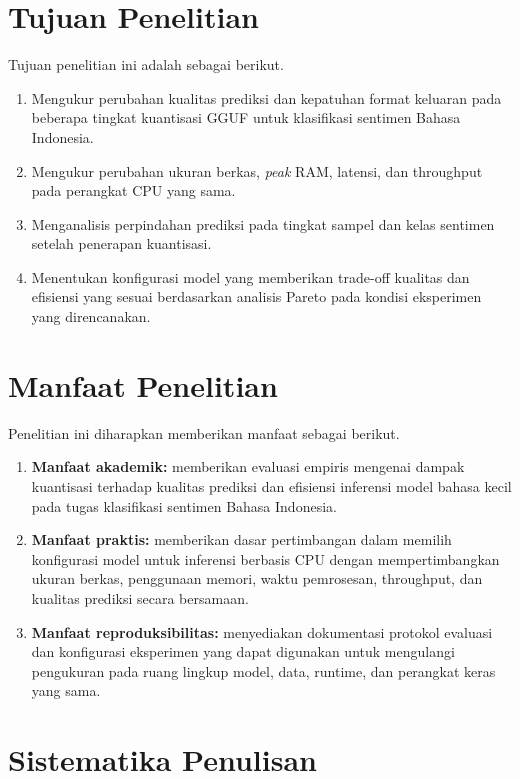 \section{Tujuan Penelitian}

Tujuan penelitian ini adalah sebagai berikut.

\begin{enumerate}
  \item Mengukur perubahan kualitas prediksi dan kepatuhan format keluaran pada beberapa tingkat kuantisasi GGUF untuk klasifikasi sentimen Bahasa Indonesia.
  \item Mengukur perubahan ukuran berkas, \textit{peak} RAM, latensi, dan throughput pada perangkat CPU yang sama.
  \item Menganalisis perpindahan prediksi pada tingkat sampel dan kelas sentimen setelah penerapan kuantisasi.
  \item Menentukan konfigurasi model yang memberikan trade-off kualitas dan efisiensi yang sesuai berdasarkan analisis Pareto pada kondisi eksperimen yang direncanakan.
\end{enumerate}

\section{Manfaat Penelitian}

Penelitian ini diharapkan memberikan manfaat sebagai berikut.

\begin{enumerate}
  \item \textbf{Manfaat akademik:} memberikan evaluasi empiris mengenai dampak kuantisasi terhadap kualitas prediksi dan efisiensi inferensi model bahasa kecil pada tugas klasifikasi sentimen Bahasa Indonesia.
  \item \textbf{Manfaat praktis:} memberikan dasar pertimbangan dalam memilih konfigurasi model untuk inferensi berbasis CPU dengan mempertimbangkan ukuran berkas, penggunaan memori, waktu pemrosesan, throughput, dan kualitas prediksi secara bersamaan.
  \item \textbf{Manfaat reproduksibilitas:} menyediakan dokumentasi protokol evaluasi dan konfigurasi eksperimen yang dapat digunakan untuk mengulangi pengukuran pada ruang lingkup model, data, runtime, dan perangkat keras yang sama.
\end{enumerate}

\section{Sistematika Penulisan}


